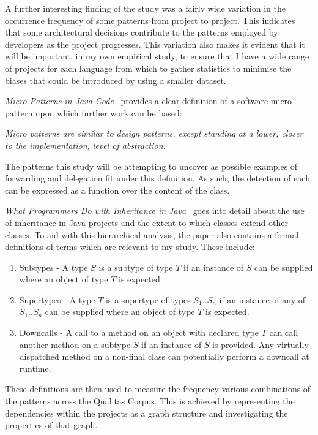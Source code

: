 A further interesting finding of the study was a fairly wide variation in the occurrence frequency of some patterns from project to project. This indicates that some architectural decisions contribute to the patterns employed by developers as the project progresses. This variation also makes it evident that it will be important, in my own empirical study, to ensure that I have a wide range of projects for each language from which to gather statistics to minimise the biases that could be introduced by using a smaller dataset.
\newline

\textit{Micro Patterns in Java Code}~\cite{JavaMicropatterns} provides a clear definition of a software micro pattern upon which further work can be based:
\begin{displayquote}\textit{
	Micro patterns are similar to design patterns, except standing at a lower, closer to the implementation, level of abstraction.}~\cite{JavaMicropatterns}
\end{displayquote}

The patterns this study will be attempting to uncover as possible examples of forwarding and delegation fit under this definition. As such, the detection of each can be expressed as a function over the content of the class.
\newline

\textit{What Programmers Do with Inheritance in Java}~\cite{InheritanceInJava} goes into detail about the use of inheritance in Java projects and the extent to which classes extend other classes. To aid with this hierarchical analysis, the paper also contains a formal definitions of terms which are relevant to my study. These include:
\begin{enumerate}
	\item Subtypes - A type $S$ is a subtype of type $T$ if an instance of $S$ can be supplied where an object of type $T$ is expected.
	\item Supertypes - A type $T$ is a supertype of types $S_1..S_n$ if an instance of any of $S_1..S_n$ can be supplied where an object of type $T$ is expected.
	\item Downcalls - A call to a method on an object with declared type $T$ can call another method on a subtype $S$ if an instance of $S$ is provided. Any virtually dispatched method on a non-final class can potentially perform a downcall at runtime.
\end{enumerate}

These definitions are then used to measure the frequency various combinations of the patterns across the Qualitas Corpus. This is achieved by representing the dependencies within the projects as a graph structure and investigating the properties of that graph.
\newline

